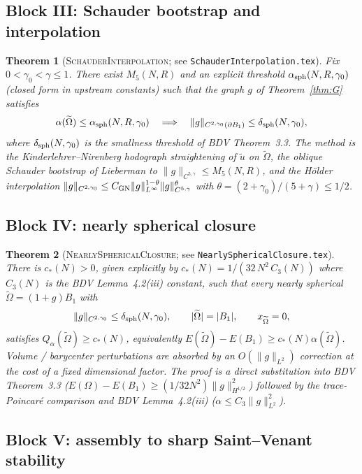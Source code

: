 \documentclass[11pt]{article}
\newtheorem{theorem}{Theorem}[section]
\theoremstyle{definition}
\newcommand{\Om}{\Omega}
\newcommand{\Otilde}{\widetilde{\Omega}}
\begin{document}
\subsection{Block III: Schauder bootstrap and interpolation}

\begin{theorem}[\textsc{SchauderInterpolation}; see
\texttt{SchauderInterpolation.tex}]\label{thm:I}
Fix $0<\gamma_0<\gamma\le1$. There exist
$M_5(N,R)$ and an explicit threshold
$\alpha_{\rm sph}(N,R,\gamma_0)$ (closed form in upstream constants)
such that the graph $g$ of Theorem~\ref{thm:G} satisfies
\[
\alpha(\Otilde)\le\alpha_{\rm sph}(N,R,\gamma_0)
\quad\Longrightarrow\quad
\|g\|_{C^{2,\gamma_0}(\partial B_1)}\le\delta_{\rm sph}(N,\gamma_0),
\]
where $\delta_{\rm sph}(N,\gamma_0)$ is the smallness threshold of
BDV Theorem~3.3. The method is the Kinderlehrer--Nirenberg hodograph
straightening of $\widetilde u$ on $\Otilde$, the oblique Schauder
bootstrap of Lieberman to $\|g\|_{C^{5,\gamma}}\le M_5(N,R)$, and the
Hölder interpolation $\|g\|_{C^{2,\gamma_0}}\le
C_{\rm GN}\|g\|_{L^\infty}^{1-\theta}\|g\|_{C^{5,\gamma}}^\theta$
with $\theta=(2+\gamma_0)/(5+\gamma)\le 1/2$.
\end{theorem}

\subsection{Block IV: nearly spherical closure}

\begin{theorem}[\textsc{NearlySphericalClosure}; see
\texttt{NearlySphericalClosure.tex}]\label{thm:N}
There is $c_*(N)>0$, given explicitly by
$c_*(N)=1/(32\,N^2\,C_3(N))$ where $C_3(N)$ is the BDV
Lemma~4.2(iii) constant, such that every nearly spherical
$\Otilde=(1+g)B_1$ with
\[
\|g\|_{C^{2,\gamma_0}}\le\delta_{\rm sph}(N,\gamma_0),\qquad
|\Otilde|=|B_1|,\qquad x_{\Otilde}=0,
\]
satisfies $Q_\alpha(\Otilde)\ge c_*(N)$, equivalently
$E(\Otilde)-E(B_1)\ge c_*(N)\alpha(\Otilde)$. Volume / barycenter
perturbations are absorbed by an $O(\|g\|_{L^2})$ correction at the
cost of a fixed dimensional factor. The proof is a direct substitution
into BDV Theorem~3.3
($E(\Om)-E(B_1)\ge(1/32N^2)\|g\|_{H^{1/2}}^2$) followed by the
trace-Poincar\'e comparison and BDV Lemma~4.2(iii)
($\alpha\le C_3\|g\|_{L^2}^2$).
\end{theorem}

\subsection{Block V: assembly to sharp Saint--Venant stability}
\end{document}
